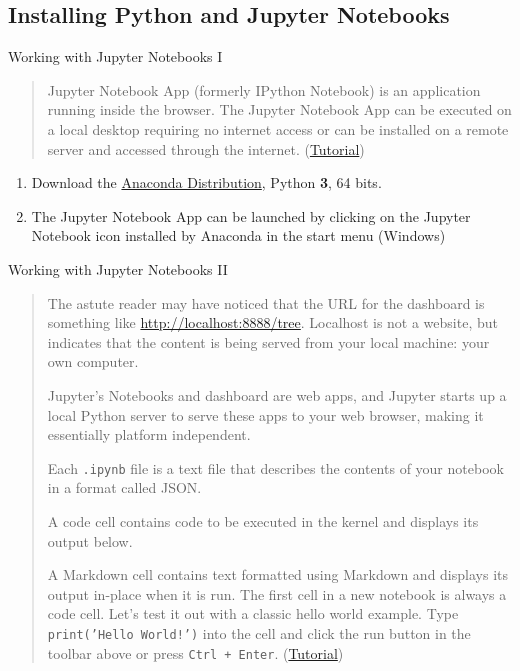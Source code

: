 \documentclass[10pt,a4paper]{article}
\begin{document}
\begin{multicols}{3}
\subsection{Installing Python and Jupyter Notebooks}

\begin{textbox}{Working with Jupyter Notebooks I}

\begin{quote}
Jupyter Notebook App (formerly IPython Notebook) is an application running inside the browser. \punkti The Jupyter Notebook App can be executed on a local desktop requiring no internet access \punkti or can be installed on a remote server and accessed through the internet. (\href{https://jupyter-notebook-beginner-guide.readthedocs.io/en/latest/}{Tutorial})
\end{quote}

\begin{enumerate}
    \item Download the \href{https://www.anaconda.com/distribution/}{Anaconda Distribution}, Python \textbf{3}, 64 bits.
    \item The Jupyter Notebook App can be launched by clicking on the Jupyter Notebook icon installed by Anaconda in the start menu (Windows)
\end{enumerate}
\end{textbox}

\begin{textbox}{Working with Jupyter Notebooks II}
\begin{quote} 
    The astute reader may have noticed that the URL for the dashboard is something like \protect\url{http://localhost:8888/tree}. Localhost is not a website, but indicates that the content is being served from your local machine: your own computer.
    
    Jupyter’s Notebooks and dashboard are web apps, and Jupyter starts up a local Python server to serve these apps to your web browser, making it essentially platform independent. 
    
    \punkti Each \texttt{.ipynb} file is a text file that describes the contents of your notebook in a format called JSON. 
    
    \punkti A code cell contains code to be executed in the kernel and displays its output below.
    
A Markdown cell contains text formatted using Markdown and displays its output in-place when it is run.
The first cell in a new notebook is always a code cell. Let’s test it out with a classic hello world example. Type \texttt{print('Hello World!')} into the cell and click the run button in the toolbar above or press \texttt{Ctrl + Enter}. (\href{https://www.dataquest.io/blog/jupyter-notebook-tutorial/}{Tutorial})
\end{quote}
\end{textbox}



\end{multicols}
\end{document}
